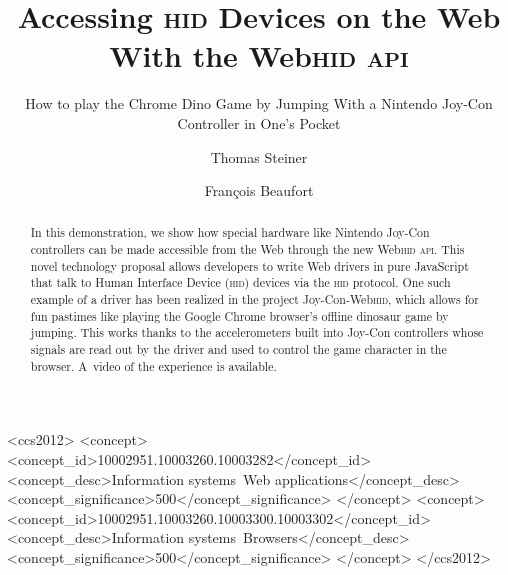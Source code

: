 \documentclass[sigconf]{acmart}
\begin{document}
\title{Accessing \textsc{hid} Devices on the Web With the Web\textsc{hid} \textsc{api}}
\subtitle{How to play the Chrome Dino Game by Jumping With a Nintendo Joy-Con Controller in One's Pocket}

\author{Thomas Steiner}

\author{François Beaufort}

\renewcommand{\shortauthors}{Thomas Steiner and François Beaufort}

\begin{abstract}
In this demonstration, we show how special hardware like Nintendo Joy-Con controllers
can be made accessible from the Web through the new Web\textsc{hid} \textsc{api}.
This novel technology proposal allows developers to write Web drivers in pure JavaScript
that talk to Human Interface Device (\textsc{hid}) devices via the \textsc{hid} protocol.
One such example of a driver has been realized in the project Joy-Con-Web\textsc{hid},
which allows for fun pastimes like playing the Google Chrome browser's
offline dinosaur game by jumping.
This works thanks to the accelerometers built into Joy-Con controllers
whose signals are read out by the driver and used to control the game
character in the browser. A~video of the experience is available.
\end{abstract}

\begin{CCSXML}
<ccs2012>
<concept>
<concept_id>10002951.10003260.10003282</concept_id>
<concept_desc>Information systems~Web applications</concept_desc>
<concept_significance>500</concept_significance>
</concept>
<concept>
<concept_id>10002951.10003260.10003300.10003302</concept_id>
<concept_desc>Information systems~Browsers</concept_desc>
<concept_significance>500</concept_significance>
</concept>
</ccs2012>
\end{CCSXML}



\maketitle
\end{document}
